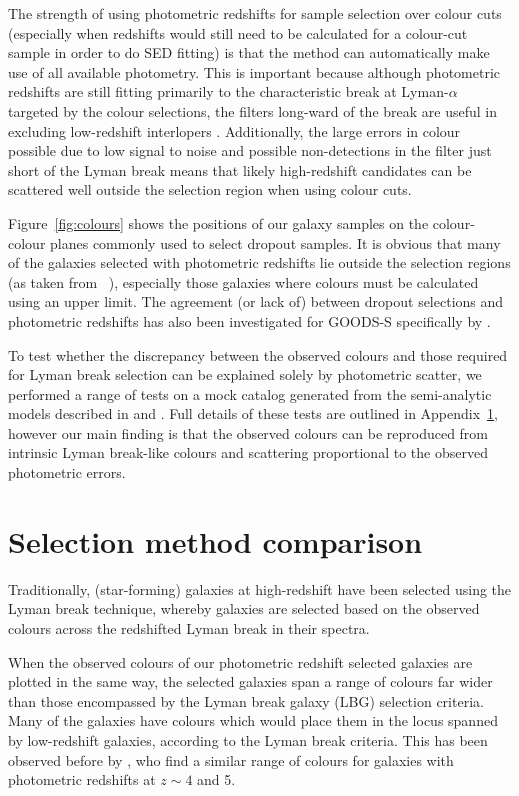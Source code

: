 The strength of using photometric redshifts for sample selection over colour cuts (especially when redshifts would still need to be calculated for a colour-cut sample in order to do SED fitting) is that the method can automatically make use of all available photometry. This is important because although photometric redshifts are still fitting primarily to the characteristic break at Lyman-$\alpha$ targeted by the colour selections, the filters long-ward of the break are useful in excluding low-redshift interlopers \citep{2011MNRAS.418.2074M}. Additionally, the large errors in colour possible due to low signal to noise and possible non-detections in the filter just short of the Lyman break means that likely high-redshift candidates can be scattered well outside the selection region when using colour cuts. 

Figure~\ref{fig:colours} shows the positions of our galaxy samples on the colour-colour planes commonly used to select dropout samples. It is obvious that many of the galaxies selected with photometric redshifts lie outside the selection regions (as taken from \citeauthor{2007ApJ...670..928B}~\citeyear{2007ApJ...670..928B}), especially those galaxies where colours must be calculated using an upper limit. The agreement (or lack of) between dropout selections and photometric redshifts has also been investigated for GOODS-S specifically by \citet{2010ApJ...724..425D}.

To test whether the discrepancy between the observed colours and those required for Lyman break selection can be explained solely by photometric scatter, we performed a range of tests on a mock catalog generated from the semi-analytic models described in \citet{Somerville:2008ed} and \citet{Somerville:2012cq}. Full details of these tests are outlined in Appendix~\ref{app:selection}, however our main finding is that the observed colours can be reproduced from intrinsic Lyman break-like colours and scattering proportional to the observed photometric errors. 

\section{Selection method comparison}\label{app:selection}
Traditionally, (star-forming) galaxies at high-redshift have been selected using the Lyman break technique, whereby galaxies are selected based on the observed colours across the redshifted Lyman break in their spectra.

When the observed colours of our photometric redshift selected galaxies are plotted in the same way, the selected galaxies span a range of colours far wider than those encompassed by the Lyman break galaxy (LBG) selection criteria. Many of the galaxies have colours which would place them in the locus spanned by low-redshift galaxies, according to the Lyman break criteria. This has been observed before by \citet{2010ApJ...724..425D}, who find a similar range of colours for galaxies with photometric redshifts at $z \sim 4$ and 5.

